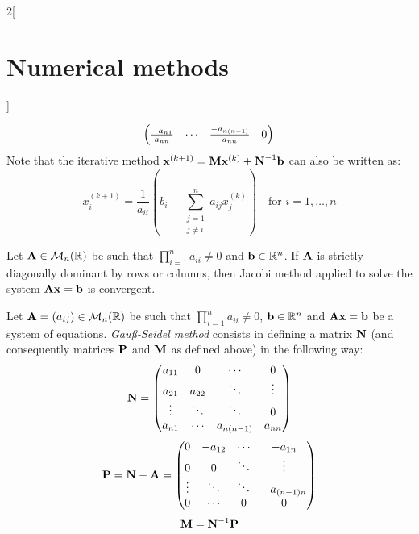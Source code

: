 \documentclass[../../../main.tex]{subfiles}
\begin{document}
\begin{multicols}{2}[\section{Numerical methods}]
\begin{definition}
\begin{equation*}
\begin{pmatrix}
        \frac{-a_{n1}}{a_{nn}} & \cdots                 & \frac{-a_{n(n-1)}}{a_{nn}} & 0
      \end{pmatrix}\\
    \end{equation*}
    Note that the iterative method $\boldsymbol{\mathrm{x}}^{(k+1)}=\boldsymbol{\mathrm{M}}\boldsymbol{\mathrm{x}}^{(k)}+\boldsymbol{\mathrm{N}}^{-1}\boldsymbol{\mathrm{b}}$ can also be written as: $$x_i^{(k+1)}=\frac{1}{a_{ii}}\left(b_i-\sum_{\substack{j=1\\j\ne i}}^na_{ij}x_j^{(k)}\right)\quad\text{for }i=1,\ldots,n$$
  \end{definition}
  \begin{theorem}
    Let $\boldsymbol{\mathrm{A}}\in\mathcal{M}_n(\mathbb{R})$ be such that $\prod_{i=1}^na_{ii}\ne 0$ and $\boldsymbol{\mathrm{b}}\in\mathbb{R}^n$. If $\boldsymbol{\mathrm{A}}$ is strictly diagonally dominant by rows or columns, then Jacobi method applied to solve the system $\boldsymbol{\mathrm{A}}\boldsymbol{\mathrm{x}}=\boldsymbol{\mathrm{b}}$ is convergent.
  \end{theorem}
  \begin{definition}
    Let $\boldsymbol{\mathrm{A}}=(a_{ij})\in\mathcal{M}_n(\mathbb{R})$ be such that $\prod_{i=1}^na_{ii}\ne 0$, $\boldsymbol{\mathrm{b}}\in\mathbb{R}^n$ and $\boldsymbol{\mathrm{A}}\boldsymbol{\mathrm{x}}=\boldsymbol{\mathrm{b}}$ be a system of equations. \emph{Gau\ss-Seidel method} consists in defining a matrix $\boldsymbol{\mathrm{N}}$ (and consequently matrices $\boldsymbol{\mathrm{P}}$ and $\boldsymbol{\mathrm{M}}$ as defined above) in the following way:
    \begin{equation*}
      \boldsymbol{\mathrm{N}}=
      \begin{pmatrix}
        a_{11} & 0      & \cdots     & 0      \\
        a_{21} & a_{22} & \ddots     & \vdots \\
        \vdots & \ddots & \ddots     & 0      \\
        a_{n1} & \cdots & a_{n(n-1)} & a_{nn}
      \end{pmatrix}
    \end{equation*}
    \begin{equation*}
      \boldsymbol{\mathrm{P}}=\boldsymbol{\mathrm{N}}-\boldsymbol{\mathrm{A}}=
      \begin{pmatrix}
        0      & -a_{12} & \cdots & -a_{1n}     \\
        0      & 0       & \ddots & \vdots      \\
        \vdots & \ddots  & \ddots & -a_{(n-1)n} \\
        0      & \cdots  & 0      & 0
      \end{pmatrix}
    \end{equation*}
    \begin{equation*}
      \boldsymbol{\mathrm{M}}=\boldsymbol{\mathrm{N}}^{-1}\boldsymbol{\mathrm{P}}
    \end{equation*}

\end{definition}
\end{multicols}
\end{document}
